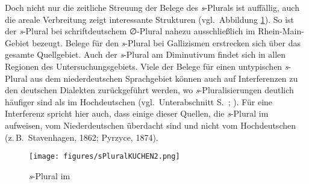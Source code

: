  
 Doch nicht nur die zeitliche Streuung der Belege des \textit{s}-Plurals ist auffällig, auch die areale Verbreitung zeigt interessante Strukturen (vgl.\, Abbildung \ref{sPluralKarte}). So ist der \textit{s}-Plural bei schriftdeutschem ∅-Plural nahezu ausschließlich im Rhein-Main-Gebiet bezeugt. Belege für den \textit{s}-Plural bei Gallizismen erstrecken sich über das gesamte Quellgebiet. Auch der \textit{s}-Plural am Diminutivum findet sich in allen Regionen des Untersuchungsgebiets. Viele der Belege für einen untypischen \textit{s}-Plural aus dem niederdeutschen Sprachgebiet können auch auf Interferenzen zu den deutschen Dialekten zurückgeführt werden, wo \textit{s}-Pluralisierungen deutlich häufiger sind als im Hochdeutschen (vgl.\, Unterabschnitt S.\, \pageref{sPlural}; \citealt[147–150]{Lindowetal1998}). Für eine Interferenz spricht hier auch, dass einige dieser Quellen, die \textit{s}-Plural im  aufweisen, vom Niederdeutschen überdacht sind und nicht vom Hochdeutschen (z.\,B.\,  Stavenhagen, 1862;  Pyrzyce, 1874). 


\begin{figure} 

\texttt{[image: figures/sPluralKUCHEN2.png]}
		\caption{\label{sPluralKarte} \textit{s}-Plural im }
		\end{figure}

		
		
